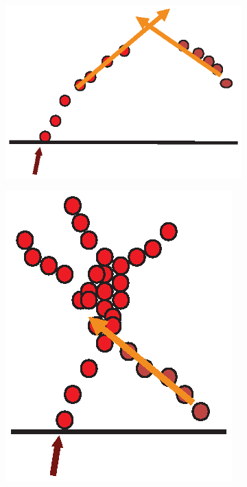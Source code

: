 \begin{figure}[tbph]
\centering
  \begin{subfigure}[b]{0.3\textwidth}
    \includegraphics[width=\textwidth]{pandora/loopTrack}
    \caption{}
    \label{fig:pandoraTopoAssoLoopTrack}
  \end{subfigure}
  \begin{subfigure}[b]{0.3\textwidth}
    \includegraphics[width=\textwidth]{pandora/backScattered}

\end{subfigure}
\end{figure}
